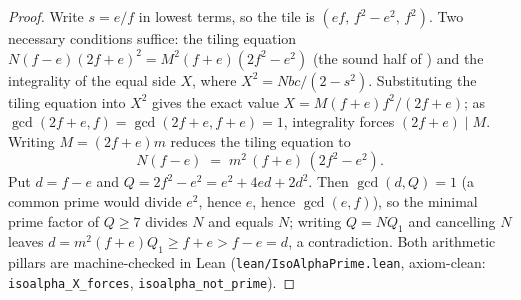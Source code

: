 \documentclass[11pt,reqno]{amsart}
\theoremstyle{plain}
\theoremstyle{definition}
\begin{document}
\begin{proof}
Write $s=e/f$ in lowest terms, so the tile is $(ef,\,f^2-e^2,\,f^2)$. Two necessary conditions
suffice: the tiling equation $N(f-e)(2f+e)^2=M^2(f+e)(2f^2-e^2)$ (the sound half of
\cite[Thm.~19]{BeesonIII}) and the integrality of the equal side $X$, where
$X^2=Nbc/(2-s^2)$. Substituting the tiling equation into $X^2$ gives the exact value
$X=M(f+e)f^2/(2f+e)$; as $\gcd(2f+e,f)=\gcd(2f+e,f+e)=1$, integrality forces $(2f+e)\mid M$.
Writing $M=(2f+e)m$ reduces the tiling equation to
\[
N(f-e)\;=\;m^2\,(f+e)\,(2f^2-e^2).
\]
Put $d=f-e$ and $Q=2f^2-e^2=e^2+4ed+2d^2$. Then $\gcd(d,Q)=1$ (a common prime would divide $e^2$,
hence $e$, hence $\gcd(e,f)$), so the minimal prime factor of $Q\ge7$ divides $N$ and equals $N$;
writing $Q=NQ_1$ and cancelling $N$ leaves $d=m^2(f+e)Q_1\ge f+e>f-e=d$, a contradiction. Both
arithmetic pillars are machine-checked in Lean (\texttt{lean/IsoAlphaPrime.lean}, axiom-clean:
\texttt{isoalpha\_X\_forces}, \texttt{isoalpha\_not\_prime}).
\end{proof}
\end{document}
